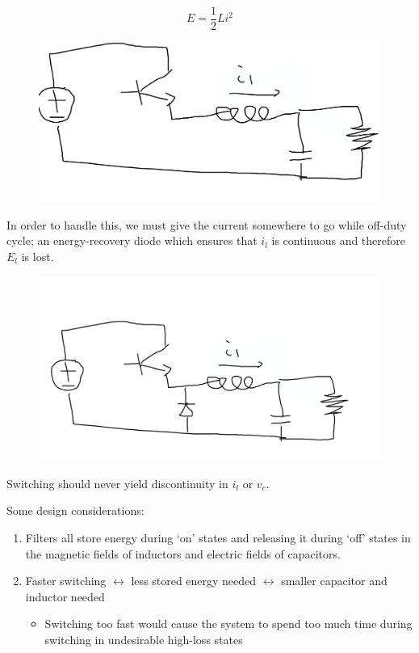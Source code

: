 \documentclass[../notes.tex]{subfiles}
\begin{document}
\begin{equation}
	E = \frac{1}{2} Li^2
\end{equation}

\begin{figure}[H]
	\centering
	\includegraphics[width=0.8\linewidth]{img/image_2022-09-23-15-39-55.png}
\end{figure}

In order to handle this, we must give the current somewhere to go while off-duty cycle; an energy-recovery diode which ensures that $ i_l $ is continuous and therefore $ E_l $ is lost.
	
\begin{figure}[H]
	\centering
	\includegraphics[width=0.8\linewidth]{img/image_2022-09-23-15-40-27.png}
\end{figure}

\begin{blockquote}
	Switching should never yield discontinuity in $ i_l $ or $ v_c $.
\end{blockquote}


Some design considerations:


\begin{enumerate}
	\item Filters all store energy during `on' states and releasing it during `off' states in the magnetic fields of inductors and electric fields of capacitors.
	\item Faster switching $ \leftrightarrow  $ less stored energy needed $ \leftrightarrow  $ smaller capacitor and inductor needed
	\begin{itemize}
		\item Switching too fast would cause the system to spend too much time during switching in undesirable high-loss states
	\end{itemize}
\end{enumerate}
\end{document}
